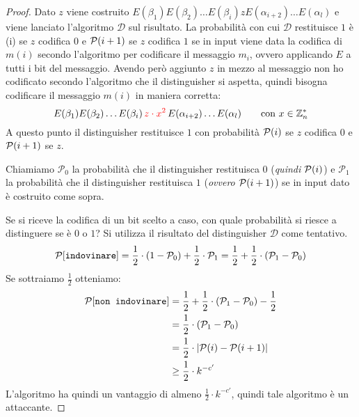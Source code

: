 \begin{proof}
Dato $z$ viene costruito $E(\beta_1)E(\beta_2)\dots E(\beta_i)zE(\alpha_{i+2})\dots E(\alpha_l)$ e viene lanciato 
l'algoritmo $\mathcal{D}$ sul risultato. La probabilità con cui $\mathcal{D}$ restituisce $1$ è \probP(i) se $z$
codifica $0$ e $\text{$\mathcal{P}$}(i+1)$ se $z$ codifica $1$ se in input viene data la codifica di $m(i)$ secondo 
l'algoritmo per codificare il messaggio $m_i$, ovvero applicando $E$ a tutti i bit del messaggio.
Avendo però aggiunto $z$ in mezzo al messaggio non ho codificato secondo l'algoritmo che il distinguisher
si aspetta, quindi bisogna codificare il messaggio $m(i)$ in maniera corretta:
\[
  E(\beta_1)E(\beta_2)\dots E(\beta_i)\,\textcolor{red}{z \cdot x^2}\,E(\alpha_{i+2})\dots E(\alpha_l)\qquad \text{con } 
  x \in \mathbb{Z}_n^*
\]
A questo punto il distinguisher restituisce $1$ con probabilità $\text{$\mathcal{P}$}(i)$ se $z$
codifica $0$ e $\text{$\mathcal{P}$}(i+1)$ se $z$.

Chiamiamo $\mathcal{P}_0$ la probabilità che il distinguisher restituisca $0$ (\textit{quindi $\text{$\mathcal{P}$}(i)$}) e 
$\mathcal{P}_1$ la probabilità che il distinguisher restituisca $1$ (\textit{ovvero $\text{$\mathcal{P}$}(i+1)$}) se in input dato è costruito come sopra.

Se si riceve la codifica di un bit scelto a caso, con quale probabilità si riesce a distinguere se è $0$ o $1$?
Si utilizza il risultato del distinguisher $\mathcal{D}$ come tentativo.
\[
  \text{$\mathcal{P}$}[\texttt{indovinare}] = \frac{1}{2} \cdot (1 - \mathcal{P}_0) + \frac{1}{2} \cdot \mathcal{P}_1 = 
  \frac{1}{2} + \frac{1}{2} \cdot (\mathcal{P}_1 - \mathcal{P}_0)
\]
Se sottraiamo $\frac{1}{2}$ otteniamo:
  \begin{align*}
    \text{$\mathcal{P}$}[\texttt{non indovinare}] &= \frac{1}{2} + \frac{1}{2} \cdot (\mathcal{P}_1 -
  \mathcal{P}_0) - \frac{1}{2} \\
  &= \frac{1}{2} \cdot (\mathcal{P}_1 - \mathcal{P}_0) \\
  &= \frac{1}{2} \cdot |\text{$\mathcal{P}$}(i) - \text{$\mathcal{P}$}(i+1)| \\
  &\geq \frac{1}{2} \cdot k^{-c'}
  \end{align*}
L'algoritmo ha quindi un vantaggio di almeno $\frac{1}{2} \cdot k^{-c'}$, quindi tale algoritmo è 
un attaccante.
\end{proof}